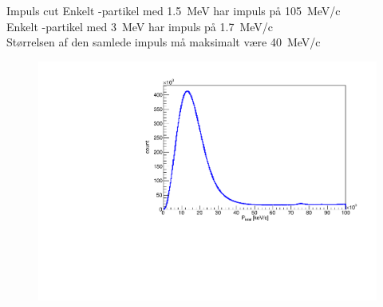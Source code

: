 \begin{frame}{Impuls cut}
	Enkelt \al-partikel med \SI{1.5}{MeV} har impuls på \SI{105}{MeV/c}\\
	Enkelt \be-partikel med \SI{3}{MeV} har impuls på \SI{1.7}{MeV/c}\\
	Størrelsen af den samlede impuls må maksimalt være \SI{40}{MeV/c}
	\begin{figure}
		\centering
		\includegraphics[width=.7\columnwidth]{../figures/ptotNoCut.pdf}
	\end{figure}
\end{frame}